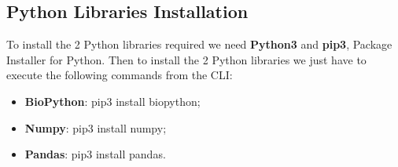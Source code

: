 \subsection{Python Libraries Installation}
To install the 2 Python libraries required we need \textbf{Python3} and \textbf{pip3}, Package Installer for Python. Then to install the 2 Python libraries we just have to execute the following commands from the CLI:
\begin{itemize}
    \item \textbf{BioPython}: pip3 install biopython;
    \item \textbf{Numpy}: pip3 install numpy;
    \item \textbf{Pandas}: pip3 install pandas.
\end{itemize}